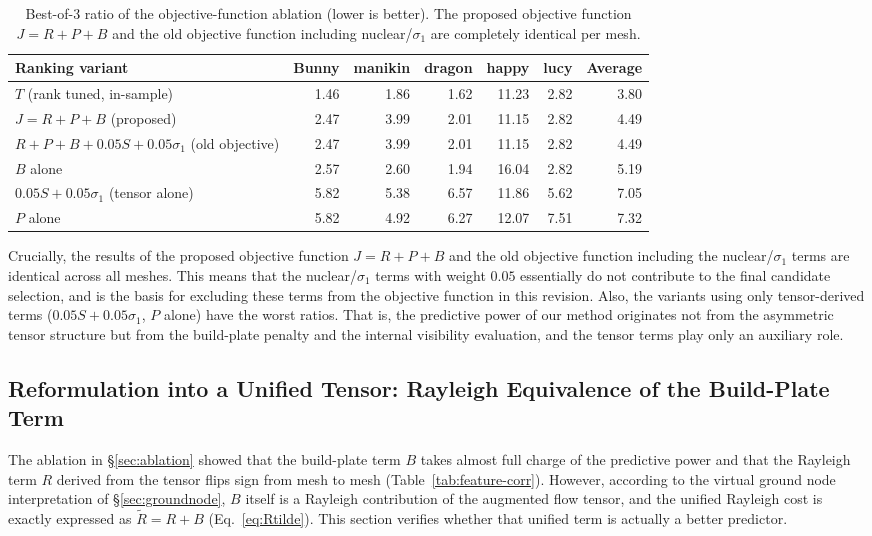 \documentclass[11pt,a4paper]{article}
\begin{document}
\begin{table}[H]
\centering
\caption{Best-of-3 ratio of the objective-function ablation (lower is better).
The proposed objective function $J=R+P+B$ and the old objective function including nuclear/$\sigma_1$ are completely identical per mesh.}
\label{tab:ablation}
\begin{tabular}{lrrrrrr}
\toprule
Ranking variant & Bunny & manikin & dragon & happy & lucy & Average\\
\midrule
$T$ (rank tuned, in-sample) & 1.46 & 1.86 & 1.62 & 11.23 & 2.82 & 3.80\\
$J=R+P+B$ (proposed)            & 2.47 & 3.99 & 2.01 & 11.15 & 2.82 & 4.49\\
$R{+}P{+}B{+}0.05S{+}0.05\sigma_1$ (old objective) & 2.47 & 3.99 & 2.01 & 11.15 & 2.82 & 4.49\\
$B$ alone                     & 2.57 & 2.60 & 1.94 & 16.04 & 2.82 & 5.19\\
$0.05S+0.05\sigma_1$ (tensor alone) & 5.82 & 5.38 & 6.57 & 11.86 & 5.62 & 7.05\\
$P$ alone                     & 5.82 & 4.92 & 6.27 & 12.07 & 7.51 & 7.32\\
\bottomrule
\end{tabular}
\end{table}

Crucially, the results of the proposed objective function $J=R+P+B$ and the old objective function including the nuclear/$\sigma_1$ terms are identical across all meshes.
This means that the nuclear/$\sigma_1$ terms with weight $0.05$ essentially do not contribute to the final candidate selection,
and is the basis for excluding these terms from the objective function in this revision.
Also, the variants using only tensor-derived terms ($0.05S+0.05\sigma_1$, $P$ alone) have the worst ratios.
That is, the predictive power of our method originates not from the asymmetric tensor structure but from the build-plate penalty and the internal visibility evaluation,
and the tensor terms play only an auxiliary role.

\subsection{Reformulation into a Unified Tensor: Rayleigh Equivalence of the Build-Plate Term}
\label{sec:unified}

The ablation in \S\ref{sec:ablation} showed that the build-plate term $B$ takes almost full charge of the predictive power
and that the Rayleigh term $R$ derived from the tensor flips sign from mesh to mesh (Table~\ref{tab:feature-corr}).
However, according to the virtual ground node interpretation of \S\ref{sec:groundnode}, $B$ itself is a Rayleigh contribution of the augmented flow tensor,
and the unified Rayleigh cost is exactly expressed as $\tilde R=R+B$ (Eq.~\eqref{eq:Rtilde}).
This section verifies whether that unified term is actually a better predictor.
\end{document}
